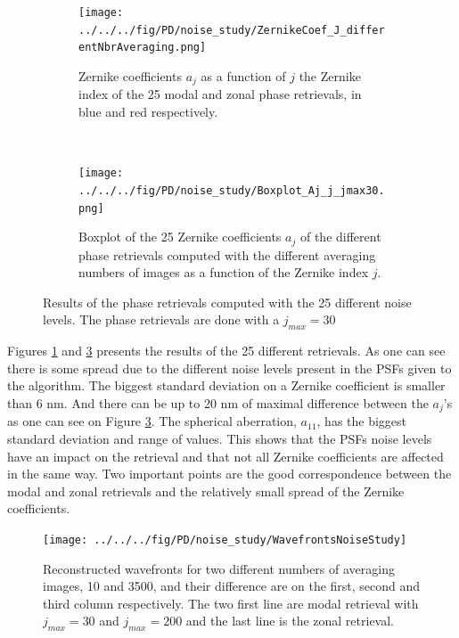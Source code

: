 \begin{figure}
\centering
    \begin{subfigure}{\textwidth}
        \texttt{[image: ../../../fig/PD/noise\_study/ZernikeCoef\_J\_differentNbrAveraging.png]}
        \caption{Zernike coefficients $a_j$ as a function of $j$ the Zernike index of the 25 modal and zonal phase retrievals, in blue and red respectively.}
        \label{subfig:ZernikeCoef_J_differentNbrAveragingjmax30}
    \end{subfigure}
    \\
    \begin{subfigure}{0.75\textwidth}
        \texttt{[image: ../../../fig/PD/noise\_study/Boxplot\_Aj\_j\_jmax30.png]}
        \caption{Boxplot of the 25 Zernike coefficients $a_j$ of the different phase retrievals computed with the different averaging numbers of images as a function of the Zernike index $j$.}
        \label{subfig:Boxplot_Aj_j_jmax30}
    \end{subfigure}
    \decoRule
    \caption{Results of the phase retrievals computed with the 25 different noise levels. The phase retrievals are done with a $j_{max} = 30$}
\end{figure}

Figures \ref{subfig:ZernikeCoef_J_differentNbrAveragingjmax30} and \ref{subfig:Boxplot_Aj_j_jmax30} presents the results of the 25 different retrievals. As one can see there is some spread due to the different noise levels present in the PSFs given to the algorithm. The biggest standard deviation on a Zernike coefficient is smaller than 6 nm. And there can be up to 20 nm of maximal difference between the $a_j$'s as one can see on Figure \ref{subfig:Boxplot_Aj_j_jmax30}. The spherical aberration, $a_{11}$, has the biggest standard deviation and range of values. This shows that the PSFs noise levels have an impact on the retrieval and that not all Zernike coefficients are affected in the same way. Two important points are the good correspondence between the modal and zonal retrievals and the relatively small spread of the Zernike coefficients.

\begin{figure}
\begin{center}
\texttt{[image: ../../../fig/PD/noise\_study/WavefrontsNoiseStudy]}
\decoRule
\caption{Reconstructed wavefronts for two different numbers of averaging images, 10 and 3500, and their difference are on the first, second and third column respectively. The two first line are modal retrieval with $j_{max}=30$ and $j_{max}=200$ and the last line is the zonal retrieval.}
\label{fig:WavefrontsNoiseStudy}
\end{center}
\end{figure}

